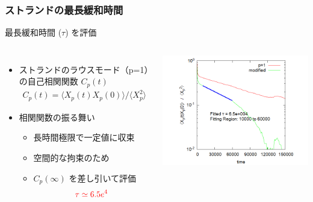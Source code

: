 \documentclass[12pt, dvipdfmx]{beamer}
\begin{document}

\begin{frame}
	\frametitle{ストランドの最長緩和時間}
	\begin{exampleblock}{最長緩和時間 ($\tau$) を評価}
		\begin{columns}[totalwidth=\linewidth]
			\begin{itemize}
				\item ストランドのラウスモード（p=1）の自己相関関数 $C_p(t)$
				\small
				\begin{align*}
					C_p(t) = \langle X_p(t)X_p(0) \rangle/\langle X_p^2 \rangle
				\end{align*}
				\normalsize
				\item 相関関数の振る舞い
				\begin{itemize}
					\item 長時間極限で一定値に収束
					\item 空間的な拘束のため
					\item $C_p(\infty)$ を差し引いて評価
					\small
					\begin{align*}
						\textcolor{red}{\tau \simeq 6.5e^{4}}
					\end{align*}
					\normalsize
				\end{itemize}
			\end{itemize}
				\centering
					\includegraphics[width=\textwidth]{Xp_1_org.png}\\

\end{columns}
\end{exampleblock}
\end{frame}
\end{document}
